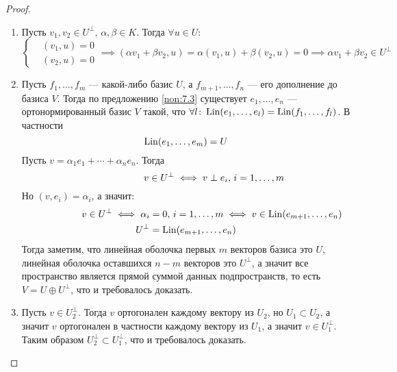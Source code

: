 \documentclass[../main.tex]{subfiles}
\begin{document}
\begin{proof}
  \begin{enumerate}
    \item Пусть $v_1, v_2 \in U^\perp,\, \alpha, \beta \in K$. Тогда $\forall u \in U$:
    \begin{equation*}
      \begin{cases}
        &(v_1, u) = 0 \\
        &(v_2, u) = 0
      \end{cases}
      \implies
      (\alpha v_1 + \beta v_2, u) = \alpha (v_1, u) + \beta (v_2, u) = 0
      \implies
      \alpha v_1 + \beta v_2 \in U^\perp
    \end{equation*}

    \item Пусть $f_1, \dotsc, f_m$ --- какой-либо базис $U$, а $f_{m + 1}, \dotsc, f_n$ --- его дополнение до базиса $V$. Тогда по предложению \ref{non:7.3} существует $e_1, \dotsc, e_n$ --- ортонормированный базис $V$ такой, что $\forall l\colon \operatorname{Lin}(e_1, \dotsc, e_l) = \operatorname{Lin}(f_1, \dotsc, f_l)$. В частности
    \begin{equation*}
      \operatorname{Lin}(e_1, \dotsc, e_m) = U
    \end{equation*}
    Пусть $v = \alpha_1 e_1 + \dotsb + \alpha_n e_n$. Тогда
    \begin{equation*}
      \hphantom{,\, i = 1,\dotsc,m}
      v \in U^\perp
      \iff
      v \perp e_i,
      \, i = 1,\dotsc,m
    \end{equation*}
    Но $(v, e_i) = \alpha_i$, а значит:
    \begin{equation*}
      \begin{gathered}
        \hphantom{\, i = 1, \dotsc, m}
        v \in U^\perp
        \iff
        \alpha_i = 0,
        \, i = 1, \dotsc, m
        \iff
        v \in \operatorname{Lin}(e_{m + 1}, \dotsc, e_n) \\
        U^\perp = \operatorname{Lin}(e_{m + 1}, \dotsc, e_n)
      \end{gathered}
    \end{equation*}
    Тогда заметим, что линейная оболочка первых $m$ векторов базиса это $U$, линейная оболочка оставшихся $n - m$ векторов это $U^\perp$, а значит все пространство является прямой суммой данных подпространств, то есть $V = U \oplus U^\perp$, что и требовалось доказать.

    \item Пусть $v \in U_2^{\perp}$. Тогда $v$ ортогонален каждому вектору из $U_2$, но $U_1 \subset U_2$, а значит $v$ ортогонален в частности каждому вектору из $U_1$, а значит $v \in U_1^{\perp}$. Таким образом $U_2^{\perp} \subset U_1^{\perp}$, что и требовалось доказать.


\end{enumerate}
\end{proof}
\end{document}
